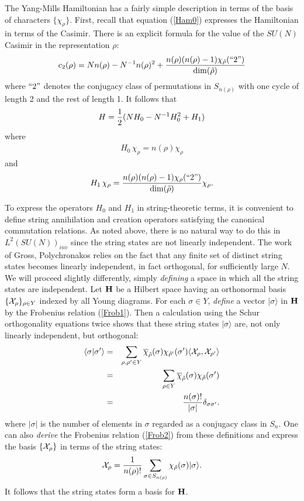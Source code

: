 \documentclass[12pt]{article}
\newcommand{\ba}{\begin{eqnarray}}
\newcommand{\Chi}{{\cal X}}
\newcommand{\ea}{\end{eqnarray}}
\renewcommand{\H}{{\bf H}}
\newcommand{\hf}{{1\over 2}}
\begin{document}
The Yang-Mills Hamiltonian has a fairly simple description in terms of
the basis of characters $\{\chi_\rho\}$.
First, recall that equation (\ref{Ham0}) expresses the
Hamiltonian in terms of the Casimir.  There is an explicit formula
for the value of the $SU(N)$ Casimir in the representation $\rho$:
\[          c_2(\rho) = Nn(\rho) - N^{-1} n(\rho)^2 +
{n(\rho)(n(\rho)-1)\chi_{\tilde\rho}(``2")\over \dim(\tilde \rho)}  \]
where $``2"$ denotes the conjugacy class of permutations in
$S_{n(\rho)}$ with one cycle of length 2 and the rest of length 1.
It follows that
\ba      H = \hf (N H_0 - N^{-1} H_0^2 + H_1)  \label{Ham1}  \ea
where
\ba    H_0\, \chi_\rho =  n(\rho)\chi_\rho  \label{Ham2}  \ea
and
\ba   H_1\, \chi_\rho = {n(\rho)(n(\rho)-1)\chi_\rho(``2")\over
\dim(\tilde\rho)}
\chi_\rho.  \label{Ham3}  \ea

To express the operators $H_0$ and $H_1$ in string-theoretic terms,
it is convenient to define
string annihilation and creation operators satisfying the canonical
commutation relations.   As noted above, there is no natural way to do
this in $L^2(SU(N))_{inv}$ since the string states
are not linearly independent.  The work of Gross,
Polychronakos relies on the fact that any finite set of distinct
string states becomes linearly independent, in fact orthogonal, for
sufficiently large $N$.  We will proceed slightly differently,
simply {\it defining} a space in which all
the string states are independent.  Let $\H$ be a Hilbert space
having an orthonormal basis
$\{\Chi_\rho\}_{\rho \in Y}$ indexed by all Young diagrams.
For each $\sigma \in Y$,
{\it define} a vector $|\sigma\rangle$ in $\H$ by the Frobenius
relation (\ref{Frob1}).   Then a calculation using the Schur orthogonality
equations twice shows that these string states
$|\sigma\rangle$ are, not only linearly independent, but orthogonal:
\ba    \langle \sigma| \sigma'\rangle &=&
\sum_{\rho,\rho' \in Y} \overline \chi_{\tilde\rho}(\sigma)
\chi_{\tilde\rho'}(\sigma') \langle \Chi_\rho, \Chi_{\rho'} \rangle
\nonumber\cr
&=&  \sum_{\rho\in Y} \overline \chi_{\tilde\rho}(\sigma)
\chi_{\tilde\rho}(\sigma')  \nonumber\cr
&=& {n(\sigma)!\over |\sigma|} \delta_{\sigma \sigma'}  .\nonumber\ea
where $|\sigma|$ is the number of elements in
$\sigma$ regarded as a conjugacy class in $S_n$.
One can also {\it derive} the Frobenius relation (\ref{Frob2})
from these definitions and express the basis $\{\Chi_\rho\}$ in terms of the
string states:
\[   \Chi_\rho = {1\over n(\rho)!}
\sum_{\sigma\in S_{n(\rho)}} \chi_{\tilde\rho}(\sigma) |\sigma\rangle .
\]
It follows that the string states form a basis for $\H$.
\end{document}
